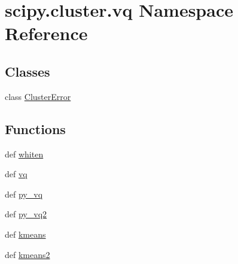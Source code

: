 \hypertarget{namespacescipy_1_1cluster_1_1vq}{}\section{scipy.\+cluster.\+vq Namespace Reference}
\label{namespacescipy_1_1cluster_1_1vq}
\subsection*{Classes}
\begin{DoxyCompactItemize}
\item 
class \hyperlink{classscipy_1_1cluster_1_1vq_1_1ClusterError}{Cluster\+Error}
\end{DoxyCompactItemize}
\subsection*{Functions}
\begin{DoxyCompactItemize}
\item 
def \hyperlink{namespacescipy_1_1cluster_1_1vq_ae5054f4f6a85a7626ef46afd302cf8d0}{whiten}
\item 
def \hyperlink{namespacescipy_1_1cluster_1_1vq_a617d8953ae056de229338f05e8c0c9ef}{vq}
\item 
def \hyperlink{namespacescipy_1_1cluster_1_1vq_a9b7d7659bff189e532c4566fac1b44bd}{py\+\_\+vq}
\item 
def \hyperlink{namespacescipy_1_1cluster_1_1vq_a65128ab172a61aefaf65322e25e394bc}{py\+\_\+vq2}
\item 
def \hyperlink{namespacescipy_1_1cluster_1_1vq_af4bfedf7fde3d48032d839db0477faa1}{kmeans}
\item 
def \hyperlink{namespacescipy_1_1cluster_1_1vq_a714311c102593f06182b0fa9f187b20f}{kmeans2}
\end{DoxyCompactItemize}
